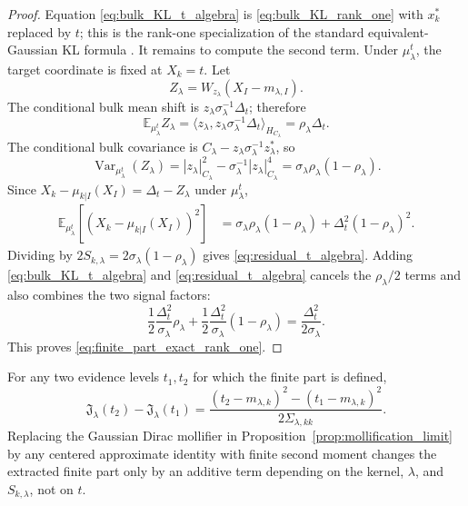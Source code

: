 \begin{proof}
Equation \eqref{eq:bulk_KL_t_algebra} is
\eqref{eq:bulk_KL_rank_one} with $x_k^*$ replaced by $t$; this is the rank-one specialization of the standard equivalent-Gaussian KL formula \cite{bogachev1998gaussian,quang2022kl}.
It remains to compute the second term.  Under $\mu_\lambda^t$, the target
coordinate is fixed at $X_k=t$.  Let
\[
  Z_\lambda=W_{z_\lambda}(X_I-m_{\lambda,I}).
\]
The conditional bulk mean shift is $z_\lambda\sigma_\lambda^{-1}\Delta_t$;
therefore
\[
  \mathbb{E}_{\mu_\lambda^t}Z_\lambda
  =\langle z_\lambda,z_\lambda\sigma_\lambda^{-1}\Delta_t
    \rangle_{H_{C_\lambda}}
  =\rho_\lambda\Delta_t.
\]
The conditional bulk covariance is
$C_\lambda-z_\lambda\sigma_\lambda^{-1}z_\lambda^*$, so
\[
  \operatorname{Var}_{\mu_\lambda^t}(Z_\lambda)
  =|z_\lambda|_{C_\lambda}^2
   -\sigma_\lambda^{-1}|z_\lambda|_{C_\lambda}^4
  =\sigma_\lambda\rho_\lambda(1-\rho_\lambda).
\]
Since
$X_k-\mu_{k|I}(X_I)=\Delta_t-Z_\lambda$ under $\mu_\lambda^t$,
\begin{align*}
  \mathbb{E}_{\mu_\lambda^t}
  \left[(X_k-\mu_{k|I}(X_I))^2\right]
  &=\sigma_\lambda\rho_\lambda(1-\rho_\lambda)
    +\Delta_t^2(1-\rho_\lambda)^2.
\end{align*}
Dividing by
$2S_{k,\lambda}=2\sigma_\lambda(1-\rho_\lambda)$ gives
\eqref{eq:residual_t_algebra}.  Adding
\eqref{eq:bulk_KL_t_algebra} and \eqref{eq:residual_t_algebra} cancels the
$\rho_\lambda/2$ terms and also combines the two signal factors:
\[
  \frac12\frac{\Delta_t^2}{\sigma_\lambda}\rho_\lambda
  +\frac12\frac{\Delta_t^2}{\sigma_\lambda}(1-\rho_\lambda)
  =\frac{\Delta_t^2}{2\sigma_\lambda}.
\]
This proves \eqref{eq:finite_part_exact_rank_one}.
\end{proof}

\begin{lemma}
\label{lem:weak_scheme_independence}
For any two evidence levels $t_1,t_2$ for which the finite part is defined,
\begin{equation}
    \mathfrak{J}_\lambda(t_2)-\mathfrak{J}_\lambda(t_1)
    =
    \frac{(t_2-m_{\lambda,k})^2-(t_1-m_{\lambda,k})^2}
    {2\Sigma_{\lambda,kk}}.
    \label{eq:weak_scheme_independence_app}
\end{equation}
Replacing the Gaussian Dirac mollifier in Proposition~\ref{prop:mollification_limit} by
any centered approximate identity with finite second moment changes the extracted
finite part only by an additive term depending on the kernel, $\lambda$, and
$S_{k,\lambda}$, not on $t$.
\end{lemma}

